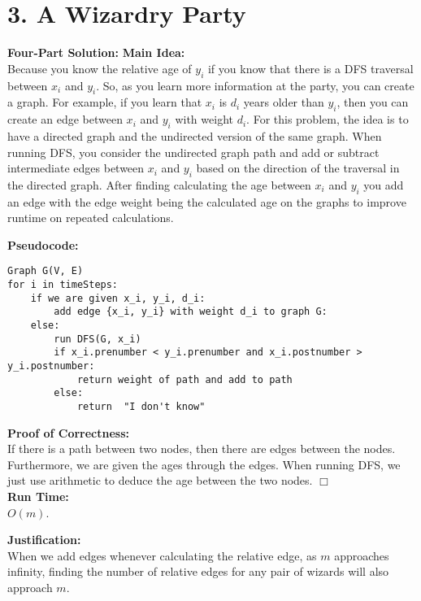 \documentclass[11pt]{article}
\def\endproofmark{$\Box$}
\newenvironment{FourPartSolution}{\par{\bf Four-Part Solution:}}{\smallskip}
\newenvironment{mainIdea}{{\bf Main Idea:}}{\smallskip}
\newenvironment{pseudocode}{\par{\bf Pseudocode:}}{\smallskip}
\newenvironment{proofOfCorrectness}{\par{\bf Proof of Correctness:}}{\endproofmark\smallskip}
\newenvironment{runTime}{{\bf Run Time:}}{\smallskip}
\newenvironment{justification}{\par{\bf Justification:}}{\smallskip}
\begin{document}
\newpage
\section*{3. A Wizardry Party}
\begin{FourPartSolution}
\begin{mainIdea}
\\
Because you know the relative age of $y_i$ if you know that there is a DFS traversal between $x_i$ and $y_i$. So, as you learn more information at the party, you can create a graph. For example, if you learn that $x_i$ is $d_i$ years older than $y_i$, then you can create an edge between $x_i$ and $y_i$ with weight $d_i$. For this problem, the idea is to have a directed graph and the undirected version of the same graph. When running DFS, you consider the undirected graph path and add or subtract intermediate edges between $x_i$ and $y_i$ based on the direction of the traversal in the directed graph. After finding calculating the age between $x_i$ and $y_i$ you add an edge with the edge weight being the calculated age on the graphs to improve runtime on repeated calculations.
\end{mainIdea}

\begin{pseudocode}
\begin{lstlisting}
Graph G(V, E)
for i in timeSteps:
	if we are given x_i, y_i, d_i:
		add edge {x_i, y_i} with weight d_i to graph G:
	else:
		run DFS(G, x_i)
		if x_i.prenumber < y_i.prenumber and x_i.postnumber > y_i.postnumber:
			return weight of path and add to path
		else:
			return  "I don't know"
\end{lstlisting}
\end{pseudocode}
\begin{proofOfCorrectness}
\\
If there is a path between two nodes, then there are edges between the nodes. Furthermore, we are given the ages through the edges. When running DFS, we just use arithmetic to deduce the age between the two nodes.
\end{proofOfCorrectness}
\\
\begin{runTime}
\\
$O(m)$.
\end{runTime}

\begin{justification}
\\
When we add edges whenever calculating the relative edge, as $m$ approaches infinity, finding the number of relative edges for any pair of wizards will also approach $m$.
\end{justification}
\end{FourPartSolution}
\end{document}

